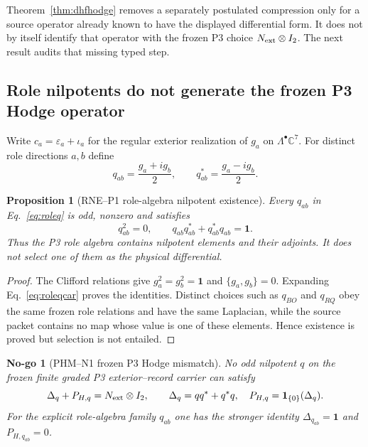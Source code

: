 \documentclass[11pt,a4paper]{article}
\newtheorem{proposition}[definition]{Proposition}
\newtheorem{nogo}[definition]{No-go}
\theoremstyle{remark}
\newcommand{\id}{\mathbf 1}
\begin{document}
Theorem~\ref{thm:dhfhodge} removes a separately postulated compression only
for a source operator already known to have the displayed differential form.
It does not by itself identify that operator with the frozen P3 choice
$N_{\rm ext}\otimes I_2$.  The next result audits that missing typed step.

\subsection{Role nilpotents do not generate the frozen P3 Hodge operator}

Write $c_a=\varepsilon_a+\iota_a$ for the regular exterior realization of
$g_a$ on $\Lambda^\bullet\mathbb C^7$.  For distinct role directions $a,b$
define
\begin{equation}
 q_{ab}=\frac{g_a+ig_b}{2},
 \qquad q_{ab}^*=\frac{g_a-ig_b}{2}.
 \label{eq:roleq}
\end{equation}

\begin{proposition}[RNE--P1 role-algebra nilpotent existence]
Every $q_{ab}$ in Eq.~\eqref{eq:roleq} is odd, nonzero and satisfies
\begin{equation}
 q_{ab}^2=0,
 \qquad q_{ab}q_{ab}^*+q_{ab}^*q_{ab}=\id.
 \label{eq:roleqcar}
\end{equation}
Thus the P3 role algebra contains nilpotent elements and their adjoints.
It does not select one of them as the physical differential.
\end{proposition}

\begin{proof}
The Clifford relations give $g_a^2=g_b^2=\id$ and
$\{g_a,g_b\}=0$.  Expanding Eq.~\eqref{eq:roleqcar} proves the identities.
Distinct choices such as $q_{BO}$ and $q_{RQ}$ obey the same frozen role
relations and have the same Laplacian, while the source packet contains no
map whose value is one of these elements.  Hence existence is proved but
selection is not entailed.
\end{proof}

\begin{nogo}[PHM--N1 frozen P3 Hodge mismatch]
No odd nilpotent $q$ on the frozen finite graded P3 exterior--record carrier
can satisfy
\begin{equation}
 \Delta_q+P_{H,q}=N_{\rm ext}\otimes I_2,
 \qquad
 \Delta_q=qq^*+q^*q,
 \quad P_{H,q}=\mathbf1_{\{0\}}(\Delta_q).
 \label{eq:p3hodgemismatch}
\end{equation}
For the explicit role-algebra family $q_{ab}$ one has the stronger identity
$\Delta_{q_{ab}}=\id$ and $P_{H,q_{ab}}=0$.
\end{nogo}
\end{document}

